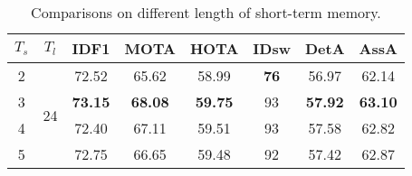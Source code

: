 \begin{table}
\centering
\footnotesize
\begin{tabular}{cc|cccccc}
\toprule[1.5pt]
        \textbf{$T_s$} & \textbf{$T_l$} & \textbf{IDF1} & \textbf{MOTA} & \textbf{HOTA} & \textbf{IDsw} & \textbf{DetA} & \textbf{AssA} \\\hline
         2 & \multirow{4}{*}{24} & 72.52& 65.62& 58.99& \textbf{76}& 56.97& 62.14\\
        3 & &\textbf{73.15}& \textbf{68.08}& \textbf{59.75} & 93 & \textbf{57.92} & \textbf{63.10}\\
        4 & &72.40 & 67.11& 59.51 & 93& 57.58& 62.82\\
        5 & &72.75 & 66.65 & 59.48& 92& 57.42& 62.87\\
\bottomrule[1.5pt]
    \end{tabular}
\vspace{-2.0mm}
\caption{Comparisons on different length of short-term memory.}
\vspace{-2.0mm}
\label{tab:ablation:memory_length_short}
\end{table}
